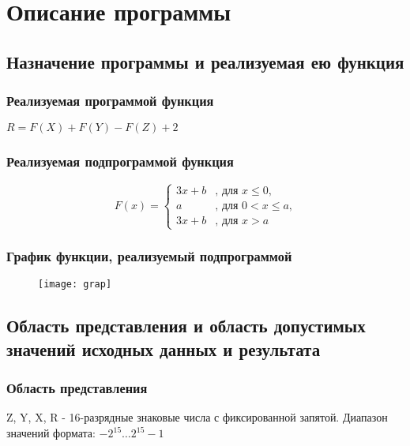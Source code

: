 \section{Описание программы}
\subsection{Назначение программы и реализуемая ею функция}
\subsubsection{Реализуемая программой функция}
	\begin{center}
		$ R = F(X) + F(Y) - F(Z) + 2 $
	\end{center}
\subsubsection{Реализуемая подпрограммой функция}
	\begin{center}
		\[
			F(x) =  \begin{cases}
			3x + b & \textrm{, для } x\leq0\textrm{,}\\
			a & \textrm{, для } 0<x\leq a\textrm{,}\\
			3x + b & \textrm{, для } x>a
			\end{cases}
		\]
	\end{center}

\subsubsection{График функции, реализуемый подпрограммой}
\begin{figure}[H]
	\centering
	\texttt{[image: grap]}
	\label{pic:grap}
\end{figure}

\subsection{Область представления и область допустимых значений исходных данных и результата}
\subsubsection{Область представления}
\noindent Z, Y, X, R - 16-разрядные знаковые числа с фиксированной запятой. Диапазон значений формата: $-2^{15}\ldots2^{15}-1$\\


